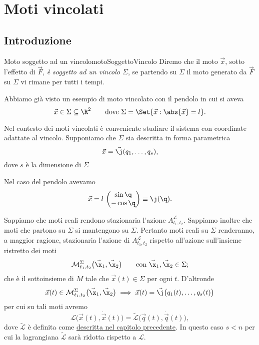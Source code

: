 \chapter{Moti vincolati}
\section{Introduzione}

\begin{defn}{Moto soggetto ad un vincolo}{motoSoggettoVincolo}
	Diremo che il moto \(\vec{x}\), sotto l'effetto di \(\vec{F}\), \emph{è soggetto ad un vincolo \(\Sigma\)}, se partendo su \(\Sigma\) il moto generato da \(\vec{F}\) su \(\Sigma\) vi rimane per tutti i tempi.
\end{defn}

\begin{ese}
	Abbiamo già visto un esempio di moto vincolato con il pendolo in cui si aveva
	\[
		\vec{x}\in \Sigma \subseteq \R^2 \qquad\text{dove }\Sigma=\Set{\vec{x}:\abs{\vec{x}}=l}.
	\]
\end{ese}
\noindent
Nel contesto dei moti vincolati è conveniente studiare il sistema con coordinate adattate al vincolo.
Supponiamo che \(\Sigma\) sia descritta in forma parametrica
\[
	\vec{x} = \vec{\j}(q_1,\ldots,q_s),
\]
dove \(s\) è la dimensione di \(\Sigma\)

\begin{ese}
	Nel caso del pendolo avevamo
	\[
		\vec{x} = l\, \begin{pmatrix}\sin\q\\-\cos\q\end{pmatrix} \equiv \j(\q).
	\]
\end{ese}
\noindent
Sappiamo che moti reali rendono stazionaria l'azione \(A_{t_1,t_2}^{\mathcal{L}}\).
Sappiamo inoltre che moti che partono su \(\Sigma\) si mantengono su \(\Sigma\). Pertanto moti reali su \(\Sigma\) renderanno, a maggior ragione, stazionaria l'azione di \(A_{t_1,t_2}^{\mathcal{L}}\) rispetto all'azione sull'insieme ristretto dei moti
\[
	\mathcal{M}_{t_1,t_2}^{\Sigma}\big(\vec{\x}_1,\vec{\x}_2\big) \qquad\text{con }\vec{\x}_1,\vec{\x}_2 \in \Sigma;
\]
che è il sottoinsieme di \(M\) tale che \(\vec{x}(t)\in\Sigma\) per ogni \(t\).
D'altronde
\[
	\vec{x}(t) \in \mathcal{M}_{t_1,t_2}^{\Sigma}\big(\vec{\x}_1,\vec{\x}_2\big) \implies \vec{x}(t) = \vec{\j}\big(q_1(t),\ldots,q_s(t)\big)
\]
per cui su tali moti avremo
\[
	\mathcal{L}\big(\vec{x}(t),\dot{\vec{x}}(t)\big) = \tilde{\mathcal{L}}\big(\vec{q}(t),\dot{\vec{q}}(t)\big),
\]
dove \(\tilde{\mathcal{L}}\) è definita come \hyperref[mk:cambiamentoVariabileEquazioneEL]{descritta nel capitolo precedente}.
In questo caso \(s<n\) per cui la lagrangiana \(\tilde{\mathcal{L}}\) sarà ridotta rispetto a \(\mathcal{L}\).

